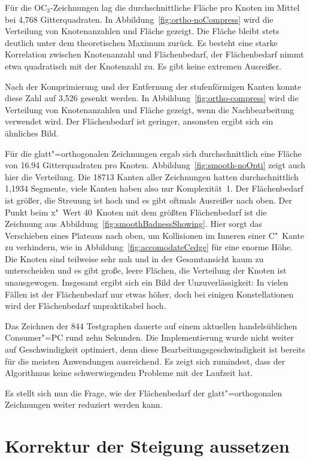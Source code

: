 \documentclass[a4paper]{scrreprt}
\theoremstyle{definition}
\begin{document}
Für die OC$_3$-Zeichnungen lag die durchschnittliche Fläche pro Knoten im Mittel bei 4,768 Gitterquadraten. In Abbildung~\ref{fig:ortho-noCompress} wird die Verteilung von Knotenanzahlen und Fläche gezeigt. Die Fläche bleibt stets deutlich unter dem theoretischen Maximum zurück. Es besteht eine starke Korrelation zwischen Knotenanzahl und Flächenbedarf, der Flächenbedarf nimmt etwa quadratisch mit der Knotenzahl zu. Es gibt keine extremen Ausreißer.

Nach der Komprimierung und der Entfernung der stufenförmigen Kanten konnte diese Zahl auf 3,526 gesenkt werden. In Abbildung~\ref{fig:ortho-compress} wird die Verteilung von Knotenanzahlen und Fläche gezeigt, wenn die Nachbearbeitung verwendet wird. Der Flächenbedarf ist geringer, ansonsten ergibt sich ein ähnliches Bild.

Für die glatt"=orthogonalen Zeichnungen ergab sich durchschnittlich eine Fläche von 16.94 Gitterquadraten pro Knoten. Abbildung~\ref{fig:smooth-noOpti} zeigt auch hier die Verteilung. Die 18713 Kanten aller Zeichnungen hatten durchschnittlich 1,1934 Segmente, viele Kanten haben also nur Komplexität~1. Der Flächenbedarf ist größer, die Streuung ist hoch und es gibt oftmals Ausreißer nach oben. Der Punkt beim x"~Wert 40~Knoten mit dem größten Flächenbedarf ist die Zeichnung aus Abbildung~\ref{fig:smoothBadnessShowing}. Hier sorgt das Verschieben eines Plateaus nach oben, um Kollisionen im Inneren einer C"~Kante zu verhindern, wie in Abbildung~\ref{fig:accomodateCedge} für eine enorme Höhe. Die Knoten sind teilweise sehr nah und in der Gesamtansicht kaum zu unterscheiden und es gibt große, leere Flächen, die Verteilung der Knoten ist unausgewogen. Insgesamt ergibt sich ein Bild der Unzuverlässigkeit: In vielen Fällen ist der Flächenbedarf nur etwas höher, doch bei einigen Konstellationen wird der Flächenbedarf unpraktikabel hoch.

Das Zeichnen der 844 Testgraphen dauerte auf einem aktuellen handelsüblichen Consumer"=PC rund zehn Sekunden. Die Implementierung wurde nicht weiter auf Geschwindigkeit optimiert, denn diese Bearbeitungsgeschwindigkeit ist bereits für die meisten Anwendungen ausreichend. Es zeigt sich zumindest, dass der Algorithmus keine schwerwiegenden Probleme mit der Laufzeit hat.

Es stellt sich nun die Frage, wie der Flächenbedarf der glatt"=orthogonalen Zeichnungen weiter reduziert werden kann.

\section{Korrektur der Steigung aussetzen}
\end{document}
